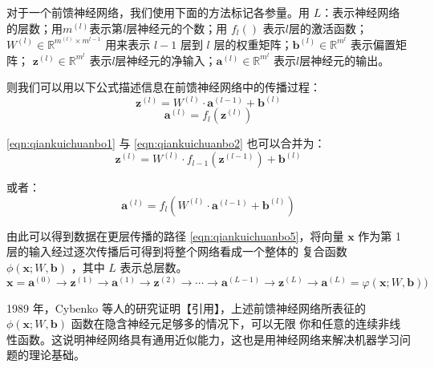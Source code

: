 对于一个前馈神经网络，我们使用下面的方法标记各参量。用 $L$：表示神经网络的层数；用$m^{(l)}$表示第$l$层神经元的个数；用
$f_l ()$ 表示$l$层的激活函数；$W ^ { ( l ) } \in \mathbb { R } ^ { m ^ { ( l ) } \times m ^ { l - 1 } }$ 用来表示
$l-1$ 层到 $l$ 层的权重矩阵；$\mathbf { b } ^ { ( l ) } \in \mathbb { R } ^ { m ^ { l } }$ 表示偏置矩阵；
$\mathbf { z } ^ { ( l ) } \in \mathbb { R } ^ { m ^ { l } }$ 表示$l$层神经元的净输入；$\mathbf { a } ^ { ( l ) } \in \mathbb { R } ^ { m ^ { l } }$
表示$l$层神经元的输出。

则我们可以用以下公式描述信息在前馈神经网络中的传播过程：
\begin{equation}
	\label{eqn:qiankuichuanbo1}
	\mathbf { z } ^ { ( l ) } = W ^ { ( l ) } \cdot \mathbf { a } ^ { ( l - 1 ) } + \mathbf { b } ^ { ( l ) }
\end{equation}
\begin{equation}
	\label{eqn:qiankuichuanbo2}
	\mathbf { a } ^ { ( l ) } = f _ { l } \left( \mathbf { z } ^ { ( l ) } \right)
\end{equation}

\ref{eqn:qiankuichuanbo1} 与 \ref{eqn:qiankuichuanbo2} 也可以合并为：
\begin{equation}
	\label{eqn:qiankuichuanbo3}
	\mathbf { z } ^ { ( l ) } = W ^ { ( l ) } \cdot f _ { l - 1 } \left( \mathbf { z } ^ { ( l - 1 ) } \right) + \mathbf { b } ^ { ( l ) }
\end{equation}

或者：
\begin{equation}
	\label{eqn:qiankuichuanbo4}
	\mathbf { a } ^ { ( l ) } = f _ { l } \left( W ^ { ( l ) } \cdot \mathbf { a } ^ { ( l - 1 ) } + \mathbf { b } ^ { ( l ) } \right)
\end{equation}

由此可以得到数据在更层传播的路径 \ref{eqn:qiankuichuanbo5}，将向量 $\mathbf{x}$ 作为第 1 层的输入经过逐次传播后可得到将整个网络看成一个整体的
复合函数 $\phi(\mathbf{x} ; W, \mathbf{b})$
，其中 $L$ 表示总层数。
\begin{equation}
	\label{eqn:qiankuichuanbo5}
	\mathbf{x}=\mathbf{a}^{(0)} \rightarrow \mathbf{z}^{(1)} \rightarrow \mathbf{a}^{(1)} \rightarrow \mathbf{z}^{(2)} \rightarrow \cdots \rightarrow \mathbf{a}^{(L-1)} \rightarrow \mathbf{z}^{(L)} \rightarrow \mathbf{a}^{(L)}=\varphi(\mathbf{x} ; W, \mathbf{b}) )
\end{equation}

1989 年，Cybenko 等人的研究证明【引用】，上述前馈神经网络所表征的 $\phi(\mathbf{x} ; W, \mathbf{b})$ 函数在隐含神经元足够多的情况下，可以无限
你和任意的连续非线性函数。这说明神经网络具有通用近似能力，这也是用神经网络来解决机器学习问题的理论基础。

